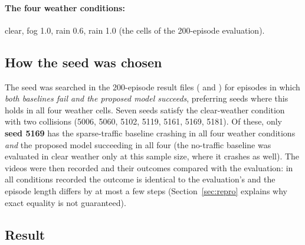 \paragraph{The four weather conditions:} clear, fog 1.0, rain 0.6, rain 1.0 (the cells of the 200-episode evaluation).

\subsection{How the seed was chosen}
The seed was searched in the 200-episode result files ( and ) for episodes in which \emph{both baselines fail and the proposed model succeeds}, preferring seeds where this holds in all four weather cells.
Seven seeds satisfy the clear-weather condition with two collisions (5006, 5060, 5102, 5119, 5161, 5169, 5181). Of these, only \textbf{seed 5169} has the sparse-traffic baseline crashing in all four weather conditions \emph{and} the proposed model succeeding in all four (the no-traffic baseline was evaluated in clear weather only at this sample size, where it crashes as well).
The videos were then recorded and their outcomes compared with the evaluation: in all conditions recorded the outcome is identical to the evaluation's and the episode length differs by at most a few steps (Section~\ref{sec:repro} explains why exact equality is not guaranteed).

\subsection{Result}
\begin{table}[H]\centering\small
\caption{The sixteen recorded videos (seed 5169, sparse traffic, front-left camera). File names in  follow the pattern .}\label{tab:videos}
\resizebox{\textwidth}{!}{}
\end{table}




